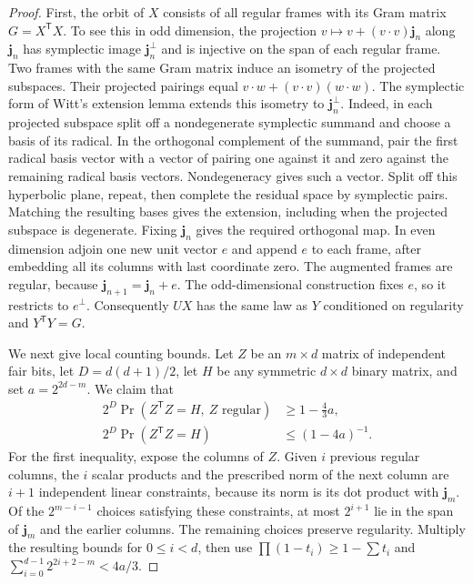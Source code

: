 \documentclass[11pt]{article}
\theoremstyle{remark}\newtheorem*{remark}{Remark}
\begin{document}
\begin{proof}
First, the orbit of $X$ consists of all regular frames with its Gram
matrix $G=X^{\mathsf T}X$. To see this in odd dimension, the projection
$v\mapsto v+(v\cdot v)\mathbf j_n$ along $\mathbf j_n$ has symplectic
image $\mathbf j_n^\perp$ and is injective on the span of each regular
frame. Two frames with the same Gram matrix induce an isometry of the
projected subspaces. Their projected pairings equal
$v\cdot w+(v\cdot v)(w\cdot w)$. The symplectic form of Witt's extension
lemma extends this isometry to $\mathbf j_n^\perp$. Indeed, in each
projected subspace split off a nondegenerate symplectic summand and
choose a basis of its radical. In the orthogonal complement of the
summand, pair the first radical basis vector with a vector of pairing
one against it and zero against the remaining radical basis vectors.
Nondegeneracy gives such a vector. Split off this hyperbolic plane,
repeat, then complete the residual space by symplectic pairs. Matching
the resulting bases gives the extension, including when the projected
subspace is degenerate. Fixing $\mathbf j_n$ gives the required orthogonal
map. In even dimension adjoin one new unit vector $e$ and append $e$
to each frame, after embedding all its columns with last coordinate zero.
The augmented frames are regular, because
$\mathbf j_{n+1}=\mathbf j_n+e$. The odd-dimensional construction fixes
$e$, so it restricts to $e^\perp$. Consequently $UX$ has the same law as
$Y$ conditioned on regularity and $Y^{\mathsf T}Y=G$.

We next give local counting bounds. Let $Z$ be an $m\times d$ matrix of
independent fair bits, let $D=d(d+1)/2$, let $H$ be any symmetric
$d\times d$ binary matrix, and set $a=2^{2d-m}$. We claim that
\begin{align}
 2^D\Pr(Z^{\mathsf T}Z=H,\ Z\text{ regular}) &\ge 1-\tfrac43a,
 \label{eq:fibre-lower}\\
 2^D\Pr(Z^{\mathsf T}Z=H) &\le (1-4a)^{-1}.
 \label{eq:fibre-upper}
\end{align}
For the first inequality, expose the columns of $Z$. Given $i$ previous
regular columns, the $i$ scalar products and the prescribed norm of the
next column are $i+1$ independent linear constraints, because its norm
is its dot product with $\mathbf j_m$. Of the $2^{m-i-1}$ choices
satisfying these constraints, at most $2^{i+1}$ lie in the span of
$\mathbf j_m$ and the earlier columns. The remaining choices preserve
regularity. Multiply the resulting bounds for $0\le i<d$, then use
$\prod(1-t_i)\ge1-\sum t_i$ and
$\sum_{i=0}^{d-1}2^{2i+2-m}<4a/3$.


\end{proof}
\end{document}
